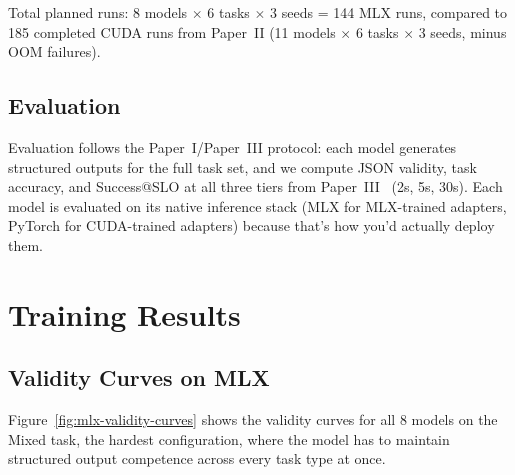 \documentclass[11pt]{article}
\begin{document}
Total planned runs: 8 models $\times$ 6 tasks $\times$ 3 seeds = 144 MLX runs, compared to 185 completed CUDA runs from Paper~II (11 models $\times$ 6 tasks $\times$ 3 seeds, minus OOM failures).

\subsection{Evaluation}

Evaluation follows the Paper~I/Paper~III protocol: each model generates structured outputs for the full task set, and we compute JSON validity, task accuracy, and Success@SLO at all three tiers from Paper~III~\citep{maloney2025agentslobench} (2s, 5s, 30s).  Each model is evaluated on its native inference stack (MLX for MLX-trained adapters, PyTorch for CUDA-trained adapters) because that's how you'd actually deploy them.


\section{Training Results}

\subsection{Validity Curves on MLX}
\label{sec:mlx-validity}

Figure~\ref{fig:mlx-validity-curves} shows the validity curves for all 8 models on the Mixed task, the hardest configuration, where the model has to maintain structured output competence across every task type at once.
\end{document}
